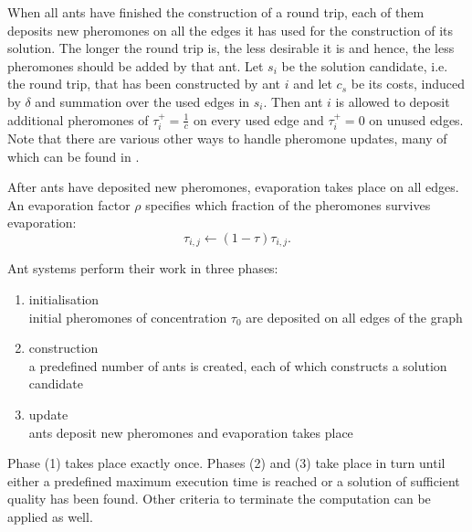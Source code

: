 
When all ants have finished the construction of a round trip, each of them deposits new pheromones on all the edges it has used for the construction of its solution. The longer the round trip is, the less desirable it is and hence, the less pheromones should be added by that ant. Let $s_i$ be the solution candidate, i.e. the round trip, that has been constructed by ant $i$ and let $c_s$ be its costs, induced by $\delta$ and summation over the used edges in $s_i$. Then ant $i$ is allowed to deposit additional pheromones of $\tau_i^+ = \frac{1}{c}$ on every used edge and $\tau_i^+ = 0$ on unused edges. Note that there are various other ways to handle pheromone updates, many of which can be found in \cite{Dorigo:2004:ACO:975277}.

After ants have deposited new pheromones, evaporation takes place on all edges. An evaporation factor $\rho$ specifies which fraction of the pheromones survives evaporation:
\vspace*{-0.5em}
\begin{equation}
  \label{eqn:evaporation}
  \tau_{i,j} \leftarrow \left( 1 - \tau \right) \tau_{i,j}.
\end{equation}

\vspace*{-0.5em}

Ant systems perform their work in three phases:
\begin{enumerate}
  \item initialisation \\
    initial pheromones of concentration $\tau_0$ are deposited on all edges of the graph
  \vspace*{-0.5em}
  \item construction \\
    a predefined number of ants is created, each of which constructs a solution candidate \hspace*{-1em}
  \vspace*{-0.5em}
  \item update \\
    ants deposit new pheromones and evaporation takes place
\end{enumerate}
Phase (1) takes place exactly once. Phases (2) and (3) take place in turn until either a predefined maximum execution time is reached or a solution of sufficient quality has been found. Other criteria to terminate the computation can be applied as well.

